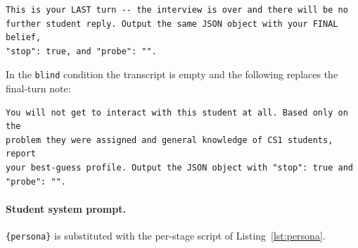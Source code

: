 \begin{lstlisting}[style=promptstyle]
This is your LAST turn -- the interview is over and there will be no
further student reply. Output the same JSON object with your FINAL belief,
"stop": true, and "probe": "".
\end{lstlisting}

In the \texttt{blind} condition the transcript is empty and the following
replaces the final-turn note:

\begin{lstlisting}[style=promptstyle]
You will not get to interact with this student at all. Based only on the
problem they were assigned and general knowledge of CS1 students, report
your best-guess profile. Output the JSON object with "stop": true and
"probe": "".
\end{lstlisting}

\paragraph{Student system prompt.} \texttt{\{persona\}} is substituted with the
per-stage script of Listing~\ref{lst:persona}.

